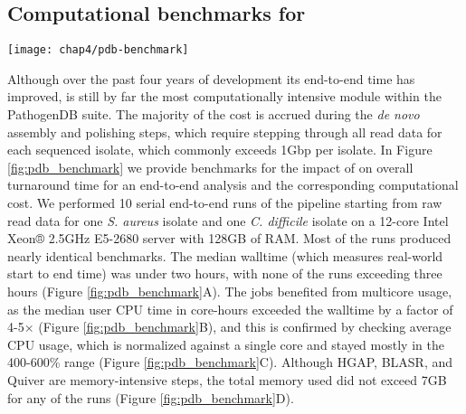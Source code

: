 \subsection{Computational benchmarks for \pathogendbpipeline}

\begin{figure*}[htb]
  \texttt{[image: chap4/pdb-benchmark]}               
  \caption[Dotplots of computational benchmarks for \pathogendbpipeline]{\textbf{Dotplots of computational benchmarks for \pathogendbpipeline{} on a \emph{S. aureus} and a \emph{C. difficile} isolate.} For each isolate, measurements were collected from 10 end-to-end serial runs of the pipeline, starting at raw read data and ending at the \texttt{prokka\textunderscore to\textunderscore igb} task, using a single server with a 12-core Intel Xeon® 2.5GHz E5-2680 CPU and 128GB of RAM. Horizontal red lines indicate the median.}
  \label{fig:pdb_benchmark}
\end{figure*}

Although over the past four years of development its end-to-end time has improved, \pathogendbpipeline{} is still by far the most computationally intensive module within the PathogenDB suite. The majority of the cost is accrued during the \emph{de novo} assembly and polishing steps, which require stepping through all read data for each sequenced isolate, which commonly exceeds 1Gbp per isolate. In Figure \ref{fig:pdb_benchmark} we provide benchmarks for the impact of \pathogendbpipeline{} on overall turnaround time for an end-to-end analysis and the corresponding computational cost. We performed 10 serial end-to-end runs of the pipeline starting from raw read data for one \emph{S. aureus} isolate and one \emph{C. difficile} isolate on a 12-core Intel Xeon® 2.5GHz E5-2680 server with 128GB of RAM. Most of the runs produced nearly identical benchmarks. The median walltime (which measures real-world start to end time) was under two hours, with none of the runs exceeding three hours (Figure \ref{fig:pdb_benchmark}A). The jobs benefited from multicore usage, as the median user CPU time in core-hours exceeded the walltime by a factor of 4-5× (Figure \ref{fig:pdb_benchmark}B), and this is confirmed by checking average CPU usage, which is normalized against a single core and stayed mostly in the 400-600\% range (Figure \ref{fig:pdb_benchmark}C). Although HGAP, BLASR, and Quiver are memory-intensive steps, the total memory used did not exceed 7GB for any of the runs (Figure \ref{fig:pdb_benchmark}D).

